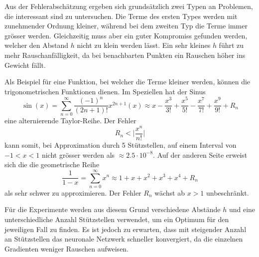 Aus der Fehlerabschätzung ergeben sich grundsätzlich zwei Typen an Problemen, die interessant sind zu untersuchen.
Die Terme des ersten Types werden mit zunehmender Ordnung kleiner, während bei dem zweiten Typ die Terme immer grösser werden.
Gleichzeitig muss aber ein guter Kompromiss gefunden werden, welcher den Abstand $h$ nicht zu klein werden lässt.
Ein sehr kleines $h$ führt zu mehr Rauschanfälligkeit, da bei benachbarten Punkten ein Rauschen höher ins Gewicht fällt.
%

Als Beispiel für eine Funktion, bei welcher die Terme kleiner werden, können die trigonometrischen Funktionen dienen.
Im Speziellen hat der Sinus
\begin{equation}
	\sin(x) = \sum _{n=0}^{\infty }{\frac {(-1)^{n}}{(2n+1)!}}x^{2n+1} \left(x\right)\approx x-{\frac {x^{3}}{3!}}+{\frac {x^{5}}{5!}}-{\frac {x^{7}}{7!}}+{\frac{x^9}{9!}}+R_n
\end{equation}
eine alternierende Taylor-Reihe.
Der Fehler
\begin{equation}
R_n < \biggl| {\frac{x^{n}}{n!} \biggr|}
\end{equation}
kann somit, bei Approximation durch 5 Stützstellen, auf einem Interval von $-1<x<1$ nicht grösser werden als $\approx 2.5 \cdot 10^{-8}$.
Auf der anderen Seite erweist sich die die geometrische Reihe
\begin{equation}
	\frac{1}{1-x} = \sum _{n=0}^{\infty} x^n \approx 1 + x + x^2 + x^3 + x^4 + R_n
\end{equation}
als sehr schwer zu approximieren.
Der Fehler $R_n$ wächst ab $x>1$ unbeschränkt.

Für die Experimente werden aus diesem Grund verschiedene Abstände
$h$ und eine unterschiedliche Anzahl Stützstellen verwendet, um ein
Optimum für den jeweiligen Fall zu finden.
Es ist jedoch zu erwarten, dass mit steigender Anzahl an Stützstellen
das neuronale Netzwerk schneller konvergiert, da die einzelnen
Gradienten weniger Rauschen aufweisen.
%
